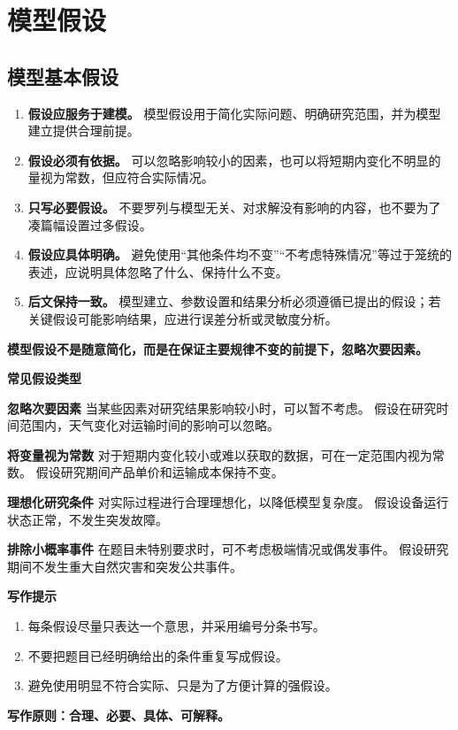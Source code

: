 \section{模型假设}
\subsection{模型基本假设}
\begin{enumerate}[label=(\arabic*), leftmargin=2.5em, itemsep=0.3em]
\item \textbf{假设应服务于建模。} 模型假设用于简化实际问题、明确研究范围，并为模型建立提供合理前提。

\item \textbf{假设必须有依据。 }可以忽略影响较小的因素，也可以将短期内变化不明显的量视为常数，但应符合实际情况。

\item \textbf{只写必要假设。} 不要罗列与模型无关、对求解没有影响的内容，也不要为了凑篇幅设置过多假设。

\item \textbf{假设应具体明确。} 避免使用“其他条件均不变”“不考虑特殊情况”等过于笼统的表述，应说明具体忽略了什么、保持什么不变。

\item \textbf{后文保持一致。} 模型建立、参数设置和结果分析必须遵循已提出的假设；若关键假设可能影响结果，应进行误差分析或灵敏度分析。
\end{enumerate}
\textbf{模型假设不是随意简化，而是在保证主要规律不变的前提下，忽略次要因素。}

\textbf{常见假设类型}

 \textbf{忽略次要因素}
当某些因素对研究结果影响较小时，可以暂不考虑。
假设在研究时间范围内，天气变化对运输时间的影响可以忽略。

 \textbf{将变量视为常数}
对于短期内变化较小或难以获取的数据，可在一定范围内视为常数。
假设研究期间产品单价和运输成本保持不变。

 \textbf{理想化研究条件}
对实际过程进行合理理想化，以降低模型复杂度。
假设设备运行状态正常，不发生突发故障。

 \textbf{排除小概率事件}
在题目未特别要求时，可不考虑极端情况或偶发事件。
假设研究期间不发生重大自然灾害和突发公共事件。

\textbf{写作提示}
\begin{enumerate}[label=(\arabic*), leftmargin=2.5em, itemsep=0.3em]
\item 每条假设尽量只表达一个意思，并采用编号分条书写。

\item 不要把题目已经明确给出的条件重复写成假设。

\item 避免使用明显不符合实际、只是为了方便计算的强假设。
\end{enumerate}


\textbf{写作原则：合理、必要、具体、可解释。}
